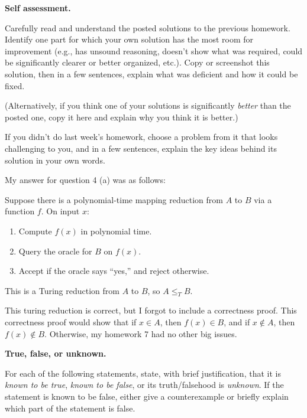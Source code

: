 \documentclass[11pt,addpoints, answers]{exam}
\newcommand{\tred}{\leq_T}
\begin{document}
\begin{questions}

  \question[10] \textbf{Self assessment.} \nopagebreak
  
  Carefully read and understand the posted solutions to the previous homework.
  Identify one part for which your own solution has the most room for improvement (e.g., has unsound reasoning, doesn’t show what was required, could be significantly clearer or better organized, etc.).
  Copy or screenshot this solution, then in a few sentences, explain what was deficient and how it could be fixed.

  (Alternatively, if you think one of your solutions is significantly \emph{better} than the posted one, copy it here and explain why you think it is better.)

  If you didn't do last week's homework, choose a problem from it that looks challenging to you, and in a few sentences, explain the key ideas behind its solution in your own words.

  \begin{solution} 
  My answer for question 4 (a) was as follows:

  \begin{solution} 
  Suppose there is a polynomial-time mapping reduction from \(A\) to \(B\) via a function \(f\). On input \(x\):
  \begin{enumerate}
      \item Compute \(f(x)\) in polynomial time.
      \item Query the oracle for \(B\) on \(f(x)\).
      \item Accept if the oracle says ``yes,'' and reject otherwise.
  \end{enumerate}
  This is a Turing reduction from \(A\) to \(B\), so \(A \tred B\).
  \end{solution}

  This turing reduction is correct, but I forgot to include a correctness proof. This correctness proof would show that if \(x \in A\), then \(f(x) \in B\), and if \(x \notin A\), then \(f(x) \notin B\). Otherwise, my homework 7 had no other big issues.
  
  \end{solution}

  \pagebreak
  \question \textbf{True, false, or unknown.}
  
    For each of the following statements, state, with brief justification, that it is \emph{known to be true}, \emph{known to be false}, or its truth/falsehood is \emph{unknown}. If the statement is known to be false, either give a counterexample or briefly explain which part of the statement is false. 


\end{questions}
\end{document}
